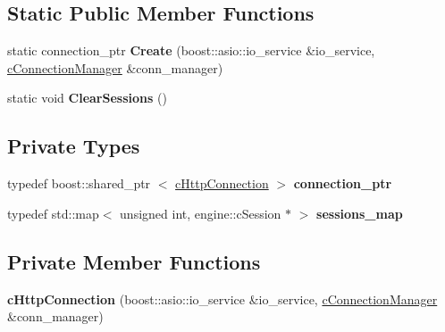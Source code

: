\subsection*{\-Static \-Public \-Member \-Functions}
\begin{DoxyCompactItemize}
\item 
\hypertarget{classhttp__server_1_1cHttpConnection_a03b465f45c06bcc42c3a4e771ab00395}{static connection\-\_\-ptr {\bfseries \-Create} (boost\-::asio\-::io\-\_\-service \&io\-\_\-service, \hyperlink{classhttp__server_1_1cConnectionManager}{c\-Connection\-Manager} \&conn\-\_\-manager)}\label{classhttp__server_1_1cHttpConnection_a03b465f45c06bcc42c3a4e771ab00395}

\item 
\hypertarget{classhttp__server_1_1cHttpConnection_a233c74cfb8a64cfb93be34e2fca92741}{static void {\bfseries \-Clear\-Sessions} ()}\label{classhttp__server_1_1cHttpConnection_a233c74cfb8a64cfb93be34e2fca92741}

\end{DoxyCompactItemize}
\subsection*{\-Private \-Types}
\begin{DoxyCompactItemize}
\item 
\hypertarget{classhttp__server_1_1cHttpConnection_a0a5b09ba857189a7f7179096fdb15c09}{typedef boost\-::shared\-\_\-ptr\*
$<$ \hyperlink{classhttp__server_1_1cHttpConnection}{c\-Http\-Connection} $>$ {\bfseries connection\-\_\-ptr}}\label{classhttp__server_1_1cHttpConnection_a0a5b09ba857189a7f7179096fdb15c09}

\item 
\hypertarget{classhttp__server_1_1cHttpConnection_aef12353a1c35536062088868a1c47d16}{typedef std\-::map$<$ unsigned int, \*
engine\-::c\-Session $\ast$ $>$ {\bfseries sessions\-\_\-map}}\label{classhttp__server_1_1cHttpConnection_aef12353a1c35536062088868a1c47d16}

\end{DoxyCompactItemize}
\subsection*{\-Private \-Member \-Functions}
\begin{DoxyCompactItemize}
\item 
\hypertarget{classhttp__server_1_1cHttpConnection_a8b0305459f933592f64fab2e3289dd54}{{\bfseries c\-Http\-Connection} (boost\-::asio\-::io\-\_\-service \&io\-\_\-service, \hyperlink{classhttp__server_1_1cConnectionManager}{c\-Connection\-Manager} \&conn\-\_\-manager)}\label{classhttp__server_1_1cHttpConnection_a8b0305459f933592f64fab2e3289dd54}

\end{DoxyCompactItemize}
